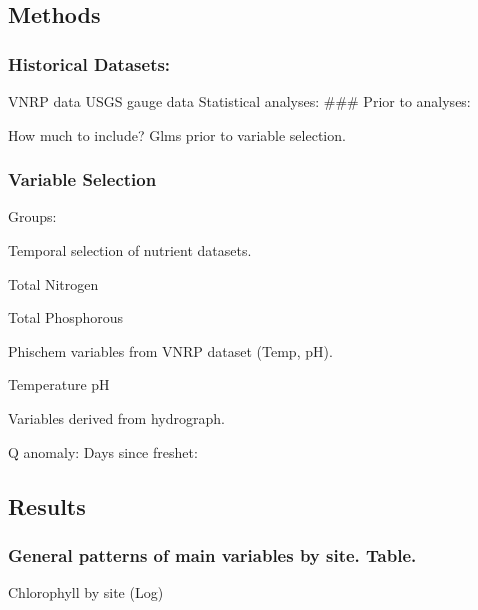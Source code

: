 \documentclass[
]{article}
\begin{document}
\hypertarget{methods}{%
\subsection{Methods}\label{methods}}

\hypertarget{historical-datasets}{%
\subsubsection{Historical Datasets:}\label{historical-datasets}}

VNRP data USGS gauge data Statistical analyses: \#\#\# Prior to
analyses:

How much to include? Glms prior to variable selection.

\hypertarget{variable-selection}{%
\subsubsection{Variable Selection}\label{variable-selection}}

Groups:

Temporal selection of nutrient datasets.

Total Nitrogen

Total Phosphorous

Phischem variables from VNRP dataset (Temp, pH).

Temperature pH

Variables derived from hydrograph.

Q anomaly: Days since freshet:

\hypertarget{results}{%
\subsection{Results}\label{results}}

\hypertarget{general-patterns-of-main-variables-by-site.-table.}{%
\subsubsection{General patterns of main variables by site.
Table.}\label{general-patterns-of-main-variables-by-site.-table.}}

Chlorophyll by site (Log)
\end{document}
